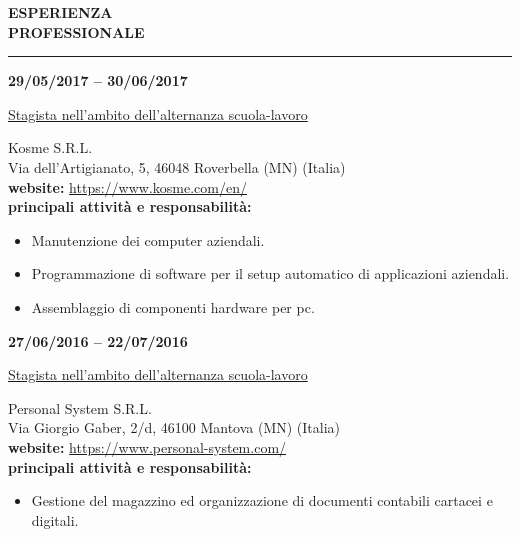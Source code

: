 \hspace{5mm}
\begin{minipage}[b]{0.3\textwidth}
	\textbf{ESPERIENZA \\PROFESSIONALE}
\end{minipage}%
\hfill
\hfill
\begin{minipage}[t]{0.6\textwidth}		
	\rule{\textwidth}{0.4pt}
\end{minipage}%
\vspace{5mm}


\begin{minipage}[t]{0.3\textwidth}
	\textbf{29/05/2017 – 30/06/2017}
\end{minipage}%
\hfill
\hfill
\begin{minipage}[t]{0.6\textwidth}		
	\begin{Large}
		\underline{Stagista nell'ambito dell'alternanza scuola-lavoro} \vspace{1mm}\\
	\end{Large} 
		Kosme S.R.L. \\
		Via dell'Artigianato, 5, 46048 Roverbella (MN) (Italia) \\
		\textbf{website:} \url{https://www.kosme.com/en/} \vspace{1mm}\\
		\textbf{principali attività e responsabilità:}
		\begin{itemize}
			\item Manutenzione dei computer aziendali.
			\item Programmazione di software per il setup automatico di applicazioni aziendali.
			\item Assemblaggio di componenti hardware per pc.
		\end{itemize}
	\vspace{4mm}
\end{minipage}%

\begin{minipage}[t]{0.3\textwidth}
	\textbf{27/06/2016 – 22/07/2016}
\end{minipage}%
\hfill
\hfill
\begin{minipage}[t]{0.6\textwidth}		
	\begin{Large}
		\underline{Stagista nell'ambito dell'alternanza scuola-lavoro} \vspace{1mm}\\
	\end{Large} 
	Personal System S.R.L. \\
	Via Giorgio Gaber, 2/d, 46100 Mantova (MN) (Italia)  \\
	\textbf{website:} \url{https://www.personal-system.com/}\\
	\textbf{principali attività e responsabilità:}
	\begin{itemize}
		\item Gestione del magazzino ed organizzazione di documenti contabili cartacei e digitali.
	\end{itemize} \vspace{1mm}
\end{minipage}%
\\